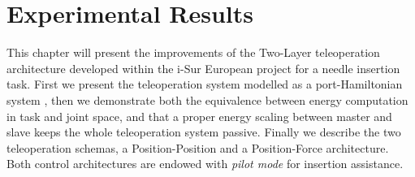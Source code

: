 \chapter{Experimental Results}

This chapter will present the improvements of the Two-Layer teleoperation architecture developed within the i-Sur European project \cite{Ferraguti2015} for a needle insertion task.
First we present the teleoperation system modelled as a port-Hamiltonian system \cite{Ferraguti2015}, then we demonstrate both the equivalence between energy computation in task and joint space, and that a proper energy scaling between master and slave keeps the whole teleoperation system passive.
Finally we describe the two teleoperation schemas, a Position-Position and a Position-Force architecture. Both control architectures are endowed with \textit{pilot mode} for insertion assistance.






\begin{table}[htbp]
	\caption{Performance Measurement: camera 10 Hz \label{tab:Performance-Measurement-10hz}}
\end{table}



